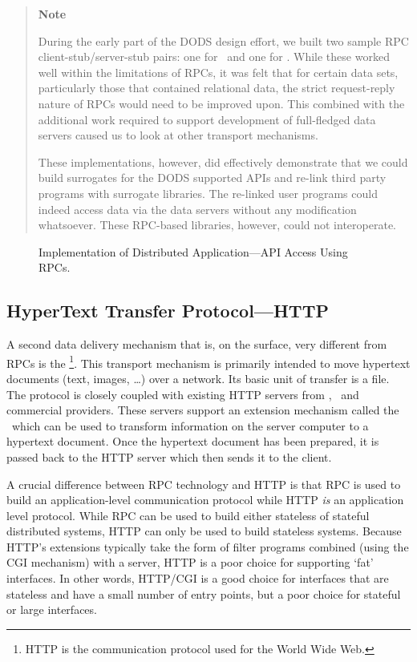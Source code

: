\begin{quote}
\small 

\centerline{{\bf Note}} During the early part of the DODS design effort, we
built two sample RPC client-stub/server-stub pairs: one for \netcdf\ and one
for \jgofs. While these worked well within the limitations of RPCs, it was
felt that for certain data sets, particularly those that contained relational
data, the strict request-reply nature of RPCs would need to be improved upon.
This combined with the additional work required to support development of
full-fledged data servers caused us to look at other transport mechanisms.

These implementations, however, did effectively demonstrate that we could
build surrogates for the DODS supported APIs and re-link third party programs
with surrogate libraries. The re-linked user programs could indeed access
data via the data servers without any modification whatsoever. These
RPC-based libraries, however, could not interoperate.

\normalsize
\end{quote}

\begin{figure}
\centerline{}
\caption{Implementation of Distributed Application---API Access Using
  RPCs.}
\label{fig:prog2client-server}
\end{figure}

\subsection{HyperText Transfer Protocol---HTTP}

A second data delivery mechanism that is, on the surface, very different from
RPCs is the \HTTP\footnote {HTTP is the communication protocol used for the
World Wide Web.}. This transport mechanism is primarily intended to move
hypertext documents (text, images, \ldots) over a network. Its basic unit of
transfer is a file. The protocol is closely coupled with existing HTTP
servers from \WWWC, \NCSA\ and commercial providers.  These servers support
an extension mechanism called the \CGI\ which can be used to transform
information on the server computer to a hypertext document. Once the
hypertext document has been prepared, it is passed back to the HTTP server
which then sends it to the client.

A crucial difference between RPC technology and HTTP is that RPC is used to
build an application-level communication protocol while HTTP {\em is\/} an
application level protocol. While RPC can be used to build either stateless
of stateful distributed systems, HTTP can only be used to build stateless
systems. Because HTTP's extensions typically take the form of filter programs
combined (using the CGI mechanism) with a server, HTTP is a poor choice for
supporting `fat' interfaces. In other words, HTTP/CGI is a good choice for
interfaces that are stateless and have a small number of entry points, but a
poor choice for stateful or large interfaces.

